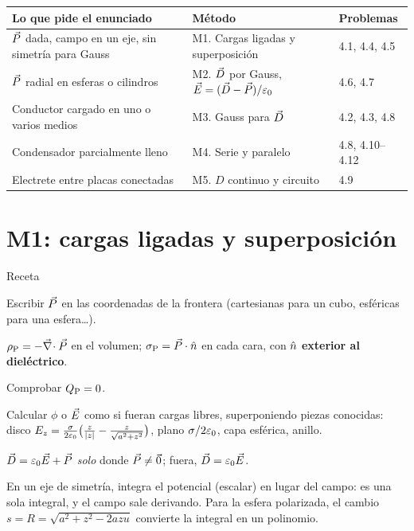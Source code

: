 \begin{center}
\small
\begin{tabularx}{\textwidth}{@{}>{\raggedright\arraybackslash}X>{\raggedright\arraybackslash}p{4.8cm}l@{}}
\toprule
Lo que pide el enunciado & Método & Problemas\\
\midrule
$\vec P$ dada, campo en un eje, sin simetría para Gauss & M1. Cargas ligadas y superposición & 4.1, 4.4, 4.5\\
$\vec P$ radial en esferas o cilindros & M2. $\vec D$ por Gauss, $\vec E=(\vec D-\vec P)/\varepsilon_0$ & 4.6, 4.7\\
Conductor cargado en uno o varios medios \LHI{} & M3. Gauss para $\vec D$ & 4.2, 4.3, 4.8\\
Condensador parcialmente lleno & M4. Serie y paralelo & 4.8, 4.10--4.12\\
Electrete entre placas conectadas & M5. $D$ continuo y circuito & 4.9\\
\bottomrule
\end{tabularx}
\end{center}

\section{M1: cargas ligadas y superposición}\label{gsec:m1}

\begin{metodo}{Receta}
\begin{pasos}
  \item Escribir $\vec P$ en las coordenadas de la frontera (cartesianas para un cubo, esféricas para una esfera\ldots).
  \item $\rho_{\mathrm P}=-\vec\nabla\!\cdot\vec P$ en el volumen; $\sigma_{\mathrm P}=\vec P\cdot\hat n$ en cada cara, con $\hat n$ \textbf{exterior al dieléctrico}.
  \item Comprobar $Q_{\mathrm P}=0$.
  \item Calcular $\phi$ o $\vec E$ como si fueran cargas libres, superponiendo piezas conocidas: disco
        $E_z=\frac{\sigma}{2\varepsilon_0}\big(\frac{z}{\left\lvert z\right\rvert}-\frac{z}{\sqrt{a^2+z^2}}\big)$, plano $\sigma/2\varepsilon_0$, capa esférica, anillo.
  \item $\vec D=\varepsilon_0\vec E+\vec P$ \emph{solo} donde $\vec P\neq\vec 0$; fuera, $\vec D=\varepsilon_0\vec E$.
\end{pasos}
\end{metodo}

\begin{consejo}
En un eje de simetría, integra el potencial (escalar) en lugar del campo: es una sola integral, y el campo sale derivando.
Para la esfera polarizada, el cambio $s=R=\sqrt{a^2+z^2-2azu}$ convierte la integral en un polinomio.
\end{consejo}


